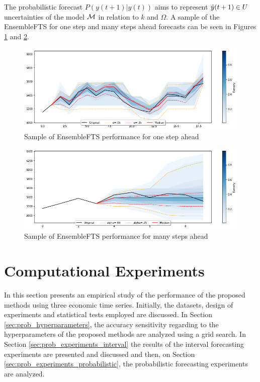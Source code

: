 The probabilistic forecast $P(y(t+1)|y(t))$ aims to represent $\hat{y}(t+1) \in U$ uncertainties of the model $\mathcal{M}$ in relation to $k$ and $\Omega$. A sample of the EnsembleFTS for one step and many steps ahead forecasts can be seen in Figures \ref{fig:ensemblefts_sample_onestep} and \ref{fig:ensemblefts_sample_manystep}. 

\begin{figure}[htb]
    \centering
    \includegraphics[width=\textwidth]{figures/ensemblefts_sample_onestep.png}
    \caption{Sample of EnsembleFTS performance for one step ahead}
    \label{fig:ensemblefts_sample_onestep}
\end{figure}

\begin{figure}[htb]
    \centering
    \includegraphics[width=\textwidth]{figures/ensemblefts_sample_manystep.png}
    \caption{Sample of EnsembleFTS performance for many steps ahead}
    \label{fig:ensemblefts_sample_manystep}
\end{figure}

%
\section{Computational Experiments}
\label{sec:prob_experiments}

In this section presents an empirical study of the performance of the proposed methods  using three economic time series. Initially, the datasets, design of experiments and statistical tests employed are discussed. In Section \ref{sec:prob_hyperparameters}, the accuracy sensitivity regarding to the hyperparameters of the proposed methods are analyzed using a grid search. In Section \ref{sec:prob_experiments_interval} the results of the interval forecasting  experiments are presented and discussed and then, on Section \ref{sec:prob_experiments_probabilistic}, the probabilistic forecasting experiments are analyzed.

